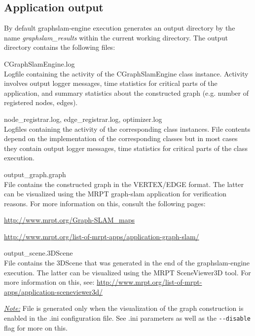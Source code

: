 \subsection{Application output}
By default graphslam-engine execution generates an output directory by the name
\textit{graphslam\_results} within the current working directory. The output directory
contains the following files:

\begin{description*}
    \item[CGraphSlamEngine.log]\hfill\\
    Logfile containing the activity of the CGraphSlamEngine class instance.
    Activity involves output logger messages, time statistics for critical
    parts of the application, and summary statistics about the constructed
    graph (e.g. number of registered nodes, edges).
    \item[node\_registrar.log, edge\_registrar.log, optimizer.log]\hfill\\
    Logfiles containing the activity of the corresponding class instances. File
    contents depend on the implementation of the corresponding classes but in
    most cases they contain output logger messages, time statistics for
    critical parts of the class execution.
    \item[output\_graph.graph]\hfill\\
    File contains the constructed graph in the VERTEX/EDGE format. The latter
    can be visualized using the MRPT graph-slam application for verification
    reasons.
    For more information on this, consult the following pages:
    \begin{itemize*}
        \item \url{http://www.mrpt.org/Graph-SLAM\_maps}
        \item \url{http://www.mrpt.org/list-of-mrpt-apps/application-graph-slam/}
    \end{itemize*}

    \item[output\_scene.3DScene]\hfill\\
        File contains the 3DScene that was generated in the end of the
        graphslam-engine execution. The latter can be visualized using the MRPT
        SceneViewer3D tool.
        For more information on this, see:
        \url{http://www.mrpt.org/list-of-mrpt-apps/application-sceneviewer3d/}

        \vspace*{10mm}
        \ul{\textit{Note:}} File is generated only when the visualization of the
        graph construction is enabled in the .ini configuration file. See .ini
        parameters as well as the \texttt{-\--disable} flag for more on this.


\end{description*}
